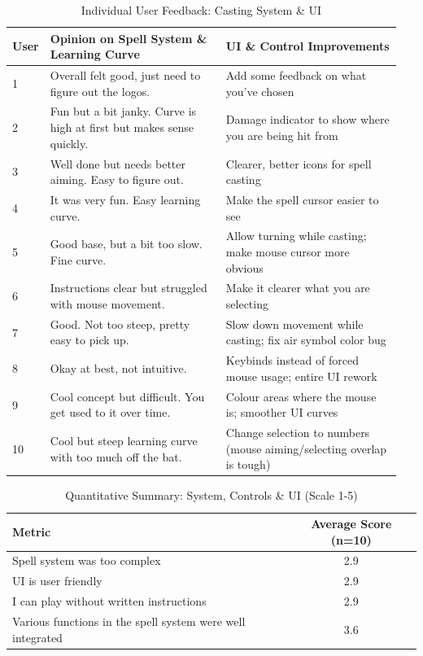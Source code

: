 \documentclass[12pt,a4paper]{report}
\begin{document}
\begin{table}[h]
\centering
\caption{Individual User Feedback: Casting System \& UI}
\label{tab:controls1}
\begin{tabular}{p{0.05\linewidth} p{0.45\linewidth} p{0.45\linewidth}}
\hline
\textbf{User} & \textbf{Opinion on Spell System \& Learning Curve} & \textbf{UI \& Control Improvements} \\
\hline
1 & Overall felt good, just need to figure out the logos. & Add some feedback on what you've chosen \\
2 & Fun but a bit janky. Curve is high at first but makes sense quickly. & Damage indicator to show where you are being hit from \\
3 & Well done but needs better aiming. Easy to figure out. & Clearer, better icons for spell casting \\
4 & It was very fun. Easy learning curve. & Make the spell cursor easier to see \\
5 & Good base, but a bit too slow. Fine curve. & Allow turning while casting; make mouse cursor more obvious \\
6 & Instructions clear but struggled with mouse movement. & Make it clearer what you are selecting \\
7 & Good. Not too steep, pretty easy to pick up. & Slow down movement while casting; fix air symbol color bug \\
8 & Okay at best, not intuitive. & Keybinds instead of forced mouse usage; entire UI rework \\
9 & Cool concept but difficult. You get used to it over time. & Colour areas where the mouse is; smoother UI curves \\
10 & Cool but steep learning curve with too much off the bat. & Change selection to numbers (mouse aiming/selecting overlap is tough) \\
\hline
\end{tabular}
\end{table}

\begin{table}[h]
\centering
\caption{Quantitative Summary: System, Controls \& UI (Scale 1-5)}
\label{tab:controls2}
\begin{tabular}{l c}
\hline
\textbf{Metric} & \textbf{Average Score (n=10)} \\
\hline
Spell system was too complex & 2.9 \\
UI is user friendly & 2.9 \\
I can play without written instructions & 2.9 \\
Various functions in the spell system were well integrated & 3.6 \\
\hline
\end{tabular}
\end{table}
\end{document}
